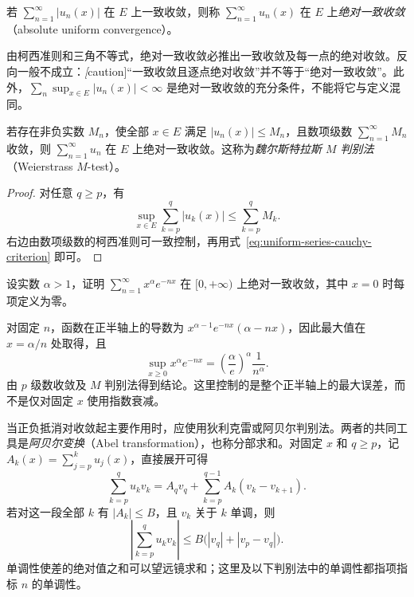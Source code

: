 \begin{definition}
\label{def:absolute-uniform-convergence}
若 $\sum_{n=1}^\infty|u_n(x)|$ 在 $E$ 上一致收敛，则称 $\sum_{n=1}^\infty u_n(x)$ 在 $E$ 上\emph{绝对一致收敛}（absolute uniform convergence）。
\end{definition}

由柯西准则和三角不等式，绝对一致收敛必推出一致收敛及每一点的绝对收敛。反向一般不成立：\emph[caution]{“一致收敛且逐点绝对收敛”并不等于“绝对一致收敛”}。此外，$\sum_n\sup_{x\in E}|u_n(x)|<\infty$ 是绝对一致收敛的充分条件，不能将它与定义混同。

\begin{theorem}
\label{thm:weierstrass-uniform-m-test}
若存在非负实数 $M_n$，使全部 $x\in E$ 满足 $|u_n(x)|\leq M_n$，且数项级数 $\sum_{n=1}^\infty M_n$ 收敛，则 $\sum_{n=1}^\infty u_n$ 在 $E$ 上绝对一致收敛。这称为\emph{魏尔斯特拉斯 $M$ 判别法}（Weierstrass $M$-test）。
\end{theorem}

\begin{proof}
对任意 $q\geq p$，有
\[
    \sup_{x\in E}\sum_{k=p}^q|u_k(x)|\leq\sum_{k=p}^qM_k.
\]
右边由数项级数的柯西准则可一致控制，再用式~\eqref{eq:uniform-series-cauchy-criterion} 即可。
\end{proof}

\begin{example}
\label{ex:uniform-exponential-function-series}
设实数 $\alpha>1$，证明 $\sum_{n=1}^\infty x^\alpha e^{-nx}$ 在 $[0,+\infty)$ 上绝对一致收敛，其中 $x=0$ 时每项定义为零。
\end{example}

\begin{solve}
对固定 $n$，函数在正半轴上的导数为 $x^{\alpha-1}e^{-nx}(\alpha-nx)$，因此最大值在 $x=\alpha/n$ 处取得，且
\[
    \sup_{x\geq0}x^\alpha e^{-nx}
    =\left(\frac\alpha e\right)^\alpha\frac1{n^\alpha}.
\]
由 $p$ 级数收敛及 $M$ 判别法得到结论。这里控制的是整个正半轴上的最大误差，而不是仅对固定 $x$ 使用指数衰减。
\end{solve}

当正负抵消对收敛起主要作用时，应使用狄利克雷或阿贝尔判别法。两者的共同工具是\emph{阿贝尔变换}（Abel transformation），也称分部求和。对固定 $x$ 和 $q\geq p$，记 $A_k(x)=\sum_{j=p}^ku_j(x)$，直接展开可得
\begin{equation}
    \sum_{k=p}^qu_kv_k
    =A_qv_q+\sum_{k=p}^{q-1}A_k(v_k-v_{k+1}).
    \label{eq:uniform-abel-summation}
\end{equation}
若对这一段全部 $k$ 有 $|A_k|\leq B$，且 $v_k$ 关于 $k$ 单调，则
\begin{equation}
    \left|\sum_{k=p}^qu_kv_k\right|
    \leq B\bigl(|v_q|+|v_p-v_q|\bigr).
    \label{eq:uniform-abel-summation-bound}
\end{equation}
单调性使差的绝对值之和可以望远镜求和；这里及以下判别法中的单调性都指项指标 $n$ 的单调性。

